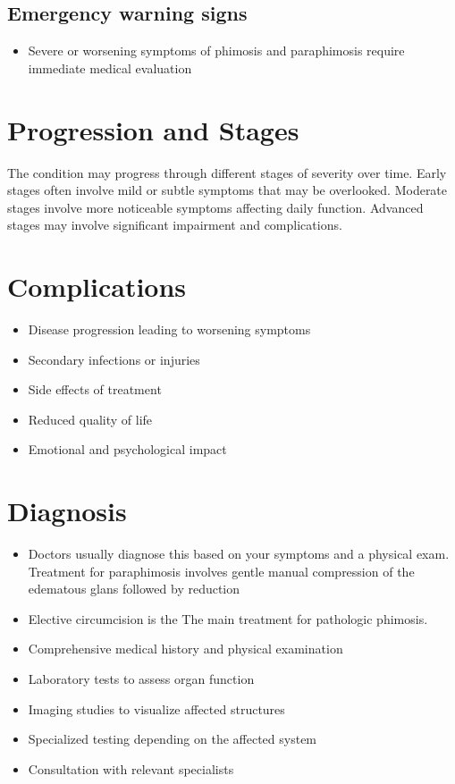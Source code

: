 \subsection{Emergency warning signs}
\begin{itemize}[noitemsep]
  \item Severe or worsening symptoms of phimosis and paraphimosis require immediate medical evaluation
\end{itemize}
\section{Progression and Stages}
The condition may progress through different stages of severity over time. Early stages often involve mild or subtle symptoms that may be overlooked. Moderate stages involve more noticeable symptoms affecting daily function. Advanced stages may involve significant impairment and complications.
\section{Complications}
\begin{itemize}[noitemsep]
  \item Disease progression leading to worsening symptoms
  \item Secondary infections or injuries
  \item Side effects of treatment
  \item Reduced quality of life
  \item Emotional and psychological impact
\end{itemize}
\section{Diagnosis}
\begin{itemize}[noitemsep]
  \item Doctors usually diagnose this based on your symptoms and a physical exam. Treatment for paraphimosis involves gentle manual compression of the edematous glans followed by reduction
  \item Elective circumcision is the The main treatment for pathologic phimosis.
  \item Comprehensive medical history and physical examination
  \item Laboratory tests to assess organ function
  \item Imaging studies to visualize affected structures
  \item Specialized testing depending on the affected system
  \item Consultation with relevant specialists
\end{itemize}

